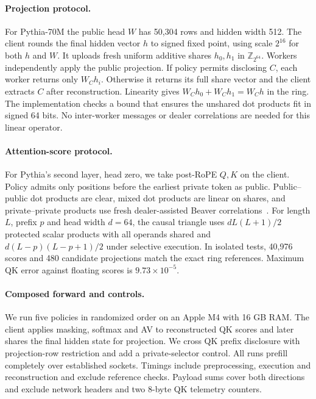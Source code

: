 \documentclass[runningheads]{llncs}
\begin{document}
\paragraph{Projection protocol.}
For Pythia-70M the public head $W$ has 50,304 rows and hidden width 512. The client rounds
the final hidden vector $h$ to signed fixed point, using scale $2^{16}$ for
both $h$ and $W$. It uploads fresh uniform additive shares $h_0,h_1$ in
$\mathbb{Z}_{2^{64}}$. Workers independently apply the public projection.
If policy permits disclosing $C$, each worker returns only $W_C h_i$.
Otherwise it returns its full share vector and the client extracts $C$
after reconstruction. Linearity gives $W_C h_0 + W_C h_1 = W_C h$ in the
ring. The implementation checks a bound that ensures the unshared dot
products fit in signed 64 bits. No inter-worker messages or dealer
correlations are needed for this linear operator.

\paragraph{Attention-score protocol.}
For Pythia's second layer, head zero, we take post-RoPE $Q,K$ on the
client. Policy admits only positions before the earliest private token
as public. Public--public dot products are clear, mixed dot products
are linear on shares, and private--private products use fresh
dealer-assisted Beaver correlations~\cite{beaver}. For length $L$, prefix $p$ and
head width $d=64$, the causal triangle uses $dL(L+1)/2$ protected
scalar products with all operands shared and $d(L-p)(L-p+1)/2$
under selective execution. In isolated tests, 40,976 scores and 480
candidate projections match the exact ring references. Maximum QK
error against floating scores is $9.73\times10^{-5}$.

\paragraph{Composed forward and controls.}
We run five policies in randomized order on an Apple M4 with 16 GB RAM.
The client applies masking, softmax and AV to reconstructed QK scores
and later shares the final hidden state for projection. We cross QK
prefix disclosure with projection-row restriction and add a private-selector
control. All runs prefill completely over established sockets. Timings
include preprocessing, execution and reconstruction and exclude reference
checks. Payload sums cover both directions and exclude network headers and
two 8-byte QK telemetry counters.
\end{document}
